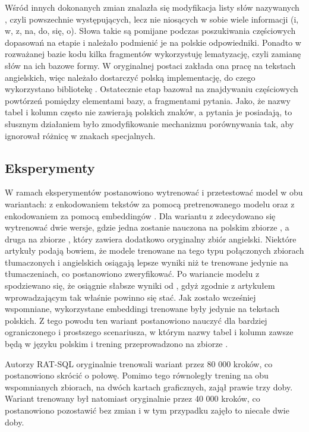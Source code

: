Wśród innych dokonanych zmian znalazła się modyfikacja listy słów nazywanych , czyli powszechnie występujących, lecz nie niosących w sobie wiele informacji (i, w, z, na, do, się, o). Słowa takie są pomijane podczas poszukiwania częściowych dopasowań na etapie  i należało podmienić je na polskie odpowiedniki. Ponadto w rozważanej bazie kodu kilka fragmentów wykorzystuję lematyzację, czyli zamianę słów na ich bazowe formy. W oryginalnej postaci zakłada ona pracę na tekstach angielskich, więc należało dostarczyć polską implementację, do czego wykorzystano bibliotekę . Ostatecznie etap  bazował na znajdywaniu częściowych powtórzeń pomiędzy elementami bazy, a fragmentami pytania. Jako, że nazwy tabel i kolumn często nie zawierają polskich znaków, a pytania je posiadają, to słusznym działaniem było zmodyfikowanie mechanizmu porównywania tak, aby ignorował różnicę w znakach specjalnych.

\subsection{Eksperymenty}

W ramach eksperymentów postanowiono wytrenować i przetestować model  w obu wariantach: z enkodowaniem tekstów za pomocą pretrenowanego modelu  oraz z enkodowaniem za pomocą embeddingów . Dla wariantu z  zdecydowano się wytrenować dwie wersje, gdzie jedna zostanie nauczona na polskim zbiorze , a druga na zbiorze , który zawiera dodatkowo oryginalny zbiór angielski. Niektóre artykuły podają bowiem, że modele trenowane na tego typu połączonych zbiorach tłumaczonych i angielskich osiągają lepsze wyniki niż te trenowane jedynie na tłumaczeniach, co postanowiono zweryfikować. Po wariancie modelu z  spodziewano się, że osiągnie słabsze wyniki od , gdyż zgodnie z artykułem wprowadzającym  tak właśnie powinno się stać. Jak zostało wcześniej wspomniane, wykorzystane embeddingi  trenowane były jedynie na tekstach polskich. Z tego powodu ten wariant postanowiono nauczyć dla bardziej ograniczonego i prostszego scenariusza, w którym nazwy tabel i kolumn zawsze będą w języku polskim i trening przeprowadzono na zbiorze .

Autorzy {RAT-SQL} oryginalnie trenowali wariant  przez 80 000 kroków, co postanowiono skrócić o połowę. Pomimo tego równoległy trening na obu wspomnianych zbiorach, na dwóch kartach graficznych, zajął prawie trzy doby. Wariant  trenowany był natomiast oryginalnie przez 40 000 kroków, co postanowiono pozostawić bez zmian i w tym przypadku zajęło to niecałe dwie doby. 

